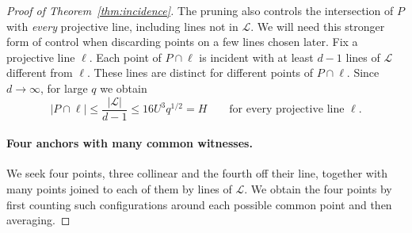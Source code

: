 \begin{proof}[Proof of Theorem~\ref{thm:incidence}]
The pruning also controls the intersection of $P$ with
\emph{every} projective line, including lines not in $\mathcal L$.
We will need this stronger form of control when discarding points
on a few lines chosen later. Fix a projective line $\ell$. Each point
of $P\cap\ell$ is incident with at least $d-1$ lines of $\mathcal L$ different from $\ell$.
These lines are distinct for different points of $P\cap\ell$.
Since $d\to\infty$, for large $q$ we obtain
\begin{equation}\label{eq:inc-all-line-cap}
 |P\cap\ell|
 \le\frac{|\mathcal L|}{d-1}
 \le16U^3q^{1/2}=H
 \qquad\text{for every projective line }\ell.
\end{equation}

\paragraph{Four anchors with many common witnesses.}
We seek four points, three collinear and the fourth off their line,
together with many points joined to each of them by lines of
$\mathcal L$. We obtain the four points by first counting such
configurations around each possible common point and then averaging.


\end{proof}
